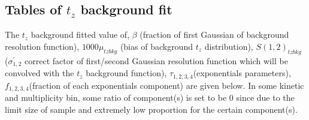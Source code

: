\subsection*{Tables of $t_z$ background fit}
The $t_z$ background fitted value of, $\beta$ (fraction of first Gaussian of background resolution function),  $1000\mu_{tzbkg}$ (bias of background $t_z$ distribution), $S(1,2)_{tzbkg}$ ($\sigma^{'}_{1,2}$ correct factor of first/second Gaussian resolution function which will be convolved with the $t_z$ background function), $\tau_{1,2,3,4}$(exponentials parameters), $f_{1,2,3,4}$(fraction of each exponentials component) are given below. 
In some kinetic and multiplicity bin, some ratio of component(s) is set to be 0 since due to the limit size of sample and extremely low proportion  for the certain component(s).
\clearpage






























\clearpage
